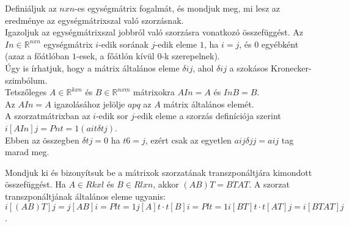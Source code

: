 \begin{frame}
  \begin{tcolorbox}[title={7. (4p)}]
      Definiáljuk az $n x n$-es egységmátrix fogalmát, és mondjuk meg, mi lesz az eredménye az egységmátrixszal való szorzásnak.\\
      
      Igazoljuk az egységmátrixszal jobbról való szorzásra vonatkozó összefüggést. 
  \tcblower
    Az $In \in \mathbb{R}^{n x n}$ egységmátrix $i$-edik sorának $j$-edik eleme $1$, ha $i = j$, és $0$ egyébként (azaz a főátlóban $1$-esek, a főátlón kívül $0$-k szerepelnek).\\
    
    Úgy is írhatjuk, hogy a mátrix általános eleme ${\delta}ij$, ahol ${\delta}ij$ a szokásos Kronecker-szimbólum.\\
    
    Tetszőleges $A \in \mathbb{R}^{k x n}$ és $B \in \mathbb{R}^{n x m}$ mátrixokra $AIn = A$ és $InB = B$.\\
    
    Az $AIn = A$ igazolásához jelölje $apq$ az $A$ mátrix általános elemét.\\
    
    A szorzatmátrixban az $i$-edik sor $j$-edik eleme a szorzás definíciója szerint $i[AIn]j = Pn t=1(ait{\delta}tj)$.\\
    
    Ebben az összegben ${\delta}tj = 0$ ha $t 6= j$, ezért csak az egyetlen $aij{\delta}jj = aij$ tag marad meg.
  \end{tcolorbox}
\end{frame}


\begin{frame}
  \begin{tcolorbox}[title={8. (4p)}]
       Mondjuk ki és bizonyítsuk be a mátrixok szorzatának transzponáltjára kimondott összefüggést. 
  \tcblower
    Ha $A \in Rkxl$ és $B \in Rlxn$, akkor $(AB)T = BTAT$. A szorzat transzponáltjának általános eleme ugyanis: $i[(AB)T]j = j[AB]i = Pl t=1 j[A]t  \cdot  t[B]i = Pl t=1 i[BT]t  \cdot  t[AT]j = i[BTAT]j$.
  \end{tcolorbox}
\end{frame}

